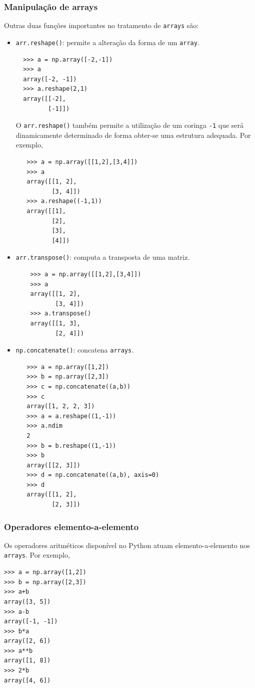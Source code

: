 \documentclass[12pt]{article}
\begin{document}
\subsubsection{Manipulação de arrays}

Outras duas funções importantes no tratamento de \lstinline+arrays+ são:
\begin{itemize}
\item \lstinline+arr.reshape()+: permite a alteração da forma de um \lstinline+array+.
  \begin{lstlisting}
  >>> a = np.array([-2,-1])
  >>> a
  array([-2, -1])
  >>> a.reshape(2,1)
  array([[-2],
         [-1]])
  \end{lstlisting}

   O \lstinline+arr.reshape()+ também permite a utilização de um coringa \lstinline+-1+ que será dinamicamente determinado de forma obter-se uma estrutura adequada. Por exemplo,
   \begin{lstlisting}
   >>> a = np.array([[1,2],[3,4]])
   >>> a
   array([[1, 2],
          [3, 4]])
   >>> a.reshape((-1,1))
   array([[1],
          [2],
          [3],
          [4]])
   \end{lstlisting}
\item \lstinline+arr.transpose()+: computa a transposta de uma matriz.
    \begin{lstlisting}
    >>> a = np.array([[1,2],[3,4]])
    >>> a
    array([[1, 2],
           [3, 4]])
    >>> a.transpose()
    array([[1, 3],
           [2, 4]])
    \end{lstlisting}
 \item \lstinline+np.concatenate()+: concatena \lstinline+arrays+.
   \begin{lstlisting}
   >>> a = np.array([1,2])
   >>> b = np.array([2,3])
   >>> c = np.concatenate((a,b))
   >>> c
   array([1, 2, 2, 3])
   >>> a = a.reshape((1,-1))
   >>> a.ndim
   2
   >>> b = b.reshape((1,-1))
   >>> b
   array([[2, 3]])
   >>> d = np.concatenate((a,b), axis=0)
   >>> d
   array([[1, 2],
          [2, 3]])
   \end{lstlisting}
\end{itemize}

\subsubsection{Operadores elemento-a-elemento}\label{subsubsection:ope-a-e}

Os operadores aritméticos disponível no Python atuam elemento-a-elemento nos \lstinline+arrays+. Por exemplo,
\begin{lstlisting}
>>> a = np.array([1,2])
>>> b = np.array([2,3])
>>> a+b
array([3, 5])
>>> a-b
array([-1, -1])
>>> b*a
array([2, 6])
>>> a**b
array([1, 8])
>>> 2*b
array([4, 6])
\end{lstlisting}
\end{document}

